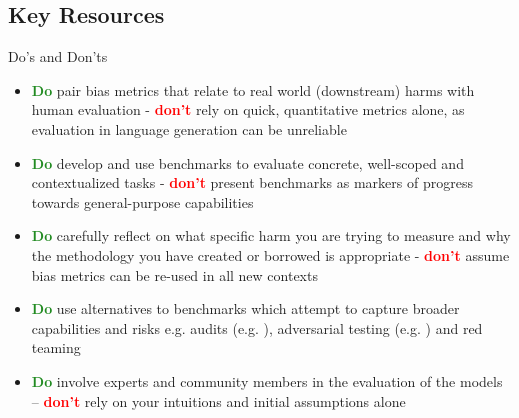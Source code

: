 \subsection{Key Resources}
Do's and Don'ts
\begin{itemize}
    \item \textcolor{ForestGreen}{\textbf{Do}} pair bias metrics that relate to real world (downstream) harms with human evaluation - \textcolor{red}{\textbf{don't}} rely on quick, quantitative metrics alone, as evaluation in language generation can be unreliable

    \item \textcolor{ForestGreen}{\textbf{Do}} develop and use benchmarks to evaluate concrete, well-scoped and contextualized tasks - \textcolor{red}{\textbf{don't}} present benchmarks as markers of progress towards general-purpose capabilities  

    \item \textcolor{ForestGreen}{\textbf{Do}} carefully reflect on what specific harm you are trying to measure and why the methodology you have created or borrowed is appropriate - \textcolor{red}{\textbf{don't}} assume bias metrics can be re-used in all new contexts

     \item \textcolor{ForestGreen}{\textbf{Do}} use alternatives to benchmarks which attempt to capture broader capabilities and risks e.g. audits (e.g. \citet{buolamwini_gender_2018}), adversarial testing (e.g. \citet{niven-kao-2019-probing}) and red teaming~\citep{ganguli_red_2022}
    
    \item \textcolor{ForestGreen}{\textbf{Do}} involve experts and community members in the evaluation of the models -- \textcolor{red}{\textbf{don't}} rely on your intuitions and initial assumptions alone

    
\end{itemize}

